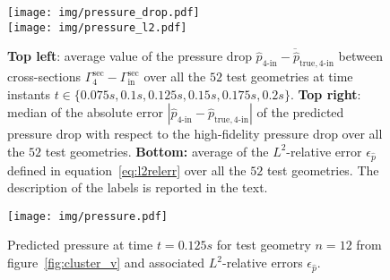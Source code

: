 \begin{figure}[!ht]
  \centering
  \texttt{[image: img/pressure\_drop.pdf]}\\
  \texttt{[image: img/pressure\_l2.pdf]}
  \caption{\textbf{Top left}: average value of the pressure drop $\overline{\widehat{p}_{4\text{-}\text{in}}-\widehat{p}_{\text{true},4\text{-}\text{in}}}$ between cross-sections $\Gamma_4^{\text{sec}}-\Gamma_\text{in}^{\text{sec}}$ over all the $52$ test geometries at time instants $t\in\{0.075s, 0.1s, 0.125s, 0.15s, 0.175s, 0.2s\}$. \textbf{Top right}: median of the absolute error $|\widehat{p}_{4\text{-}\text{in}}-\widehat{p}_{\text{true},4\text{-}\text{in}}|$ of the predicted pressure drop with respect to the high-fidelity pressure drop over all the $52$ test geometries. \textbf{Bottom: } average of the $L^2$-relative error $\epsilon_{\widehat{p}}$ defined in equation~\ref{eq:l2relerr} over all the $52$ test geometries. The description of the labels is reported in the text.}
  \label{fig:pressure_res}
\end{figure}

\begin{figure}[!ht]
  \centering
  \texttt{[image: img/pressure.pdf]}\\
  \caption{Predicted pressure at time $t=0.125s$ for test geometry $n=12$ from figure~\ref{fig:cluster_v} and associated $L^2$-relative errors $\epsilon_{\widehat{p}}$.
  }
  \label{fig:pres_12}
\end{figure}

